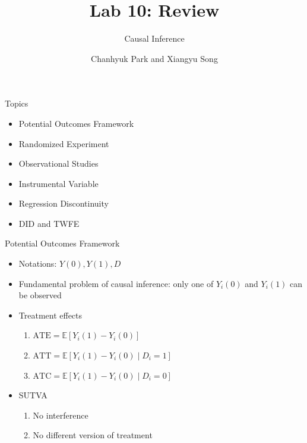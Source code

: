 \documentclass[handout]{beamer}
\title{Lab 10: Review}
\subtitle{Causal Inference}
\author{Chanhyuk Park and Xiangyu Song}
\institute{Washington University in St. Louis}
\date{}
\begin{document}
\begin{frame}
    \titlepage
\end{frame}

\begin{frame}{Topics}
    \begin{itemize}
        \item Potential Outcomes Framework
        \item Randomized Experiment
        \item Observational Studies
        \item Instrumental Variable
        \item Regression Discontinuity
        \item DID and TWFE
    \end{itemize}
\end{frame}

\begin{frame}{Potential Outcomes Framework}
    \begin{itemize}
        \item Notations: $Y(0), Y(1), D$
        \item Fundamental problem of causal inference: only one of $Y_i(0)$ and $Y_i(1)$ can be observed
        \item Treatment effects
            \begin{enumerate}
                \item $\mathrm{ATE} = \mathbb{E}\left[ Y_i(1) - Y_i(0) \right] $
                \item $\mathrm{ATT} = \mathbb{E}\left[ Y_i(1) - Y_i(0) \mid D_i = 1 \right] $
                \item $\mathrm{ATC} = \mathbb{E}\left[ Y_i(1) - Y_i(0) \mid D_i = 0 \right] $
            \end{enumerate}
        \item SUTVA
            \begin{enumerate}
                \item No interference
                \item No different version of treatment
            \end{enumerate}
    \end{itemize}
\end{frame}
\end{document}
